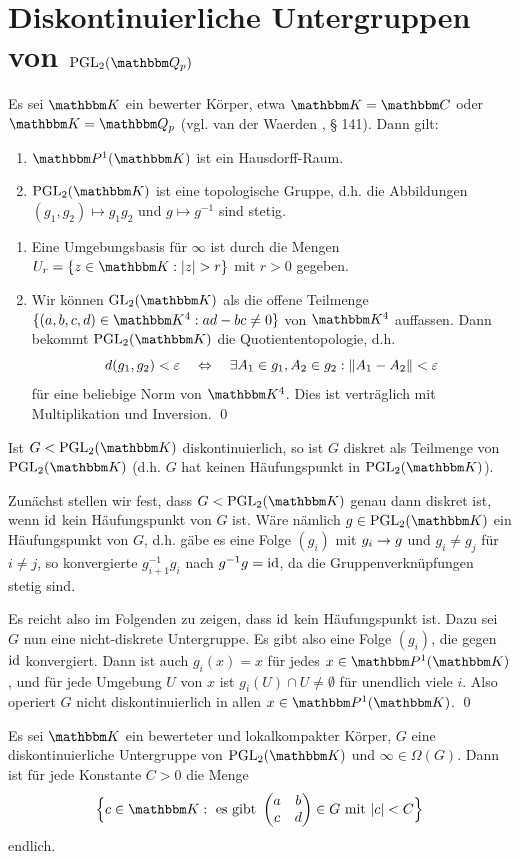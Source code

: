 \documentclass[a4paper, 12pt, twoside]{article}
\begin{document}
\section{Diskontinuierliche Untergruppen von $\PGL_2(\QQ_p)$}\label{sec_disUG}

\BEM Es sei $\KK$ ein bewerter Körper, etwa $\KK=\CC$ oder $\KK=\QQ_p$ 
(vgl. van der Waerden \cite{vdW}, § 141).
Dann gilt:
\begin{enumerate}
\item $\PP^1(\KK)$ ist ein Hausdorff-Raum.
\item $\PGL_2(\KK)$ ist eine topologische Gruppe, d.h. die
Abbildungen $(g_1,g_2)\mapsto g_1 g_2$ und $g\mapsto g^{-1}$
sind stetig.
\end{enumerate}
\bew \begin{enumerate}
\item Eine Umgebungsbasis für $\infty$ ist durch die Mengen
$U_r=\{z\in\KK:|z|>r\}$ mit $r>0$ gegeben.
\item Wir können $\GL_2(\KK)$ als die offene Teilmenge
$\{(a,b,c,d)\in\KK^4 : ad-bc \neq 0 \}$ von $\KK^4$ auffassen.
Dann bekommt $\PGL_2(\KK)$ die Quotiententopologie, d.h.
\[
d(g_1,g_2) < \varepsilon \quad \Leftrightarrow \quad
\exists A_1\in g_1, A_2\in g_2 :
\|A_1-A_2\| < \varepsilon
\]
für eine beliebige Norm von $\KK^4$.
Dies ist verträglich mit Multiplikation und Inversion.
\qed
\end{enumerate}

\BEM\label{bem_diskret}
Ist $G<\PGL_2(\KK)$ diskontinuierlich, so ist $G$ diskret 
als Teilmenge von $\PGL_2(\KK)$ (d.h. $G$ hat keinen Häufungspunkt
in $\PGL_2(\KK)$).

\bew Zunächst stellen wir fest, dass $G<\PGL_2(\KK)$ genau dann
diskret ist, wenn $\mathrm{id}$ kein Häufungspunkt von $G$ ist. Wäre nämlich
$g\in\PGL_2(\KK)$ ein Häufungspunkt von $G$, d.h. gäbe es eine
Folge $(g_i)$ mit $g_i\rightarrow g$ und $g_i\neq g_j$ für $i\neq j$, so
konvergierte $g_{i+1}^{-1} g_i$ nach $g^{-1}g=\mathrm{id}$, da die
Gruppenverknüpfungen stetig sind.

Es reicht also im Folgenden zu zeigen, dass $\mathrm{id}$ kein Häufungspunkt
ist. Dazu sei $G$ nun eine nicht-diskrete Untergruppe.
Es gibt also eine Folge $(g_i)$, die gegen $\mathrm{id}$ konvergiert.
Dann ist auch $g_i(x)=x$ für jedes $x\in\PP^1(\KK)$, und für jede
Umgebung $U$ von $x$ ist $g_i(U)\cap U\neq\emptyset$ für unendlich
viele $i$. Also operiert $G$ nicht diskontinuierlich in allen
$x\in\PP^1(\KK)$.
\qed

\BEM\label{bem_lokalkompakt}
Es sei $\KK$ ein bewerteter und lokalkompakter Körper, $G$ eine
diskontinuierliche Untergruppe von $\PGL_2(\KK)$
und $\infty\in\Omega(G)$.
Dann ist für jede Konstante $C>0$ die Menge
\[
\Bigl\{ c\in\KK: \text{ es gibt }
\begin{pmatrix}
a & b \\ c & d
\end{pmatrix}\in G
\text{ mit }
|c|<C
\Bigr\}
\]
endlich.
\end{document}
